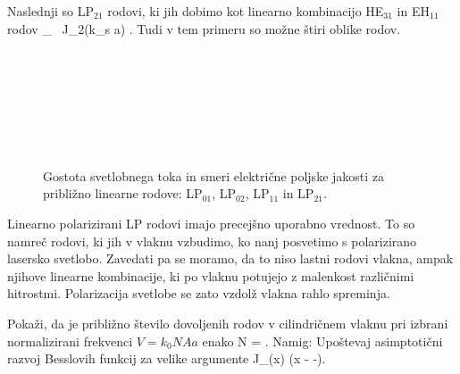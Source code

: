 Naslednji so LP$_{21}$ rodovi, ki jih dobimo kot linearno kombinacijo HE$_{31}$
in EH$_{11}$ rodov
\beq
{}_  \, J_2(k_s a)
{ \varphi \brace {}\varphi}.
\eeq
Tudi v tem primeru so možne štiri oblike rodov. 

\begin{figure}[h!]
\centering
\def\svgwidth{93truemm} 
 \\
\def\svgwidth{93truemm} 
 \\
\def\svgwidth{93truemm} 
 \\
\def\svgwidth{93truemm} 
 \\
\def\svgwidth{93truemm} 
 \\
\def\svgwidth{93truemm} 
 \\
\caption{Gostota svetlobnega toka in smeri električne poljske jakosti za približno linearne rodove:
LP$_{01}$, LP$_{02}$, LP$_{11}$ in LP$_{21}$.}
\label{fig:LP}
\end{figure}

Linearno polarizirani LP rodovi imajo precejšno uporabno vrednost. To so 
namreč rodovi, ki jih v vlaknu vzbudimo, ko nanj posvetimo s polarizirano 
lasersko svetlobo. Zavedati pa se moramo, da to niso lastni rodovi vlakna, 
ampak njihove linearne kombinacije, ki po vlaknu potujejo z malenkost različnimi
hitrostmi. Polarizacija svetlobe se zato vzdolž vlakna rahlo spreminja.

\begin{definition}
Pokaži, da je približno število dovoljenih rodov v cilindričnem vlaknu pri 
izbrani normalizirani frekvenci $V = k_0 NA a$ enako
\beq 
N = .
\eeq
Namig: Upoštevaj asimptotični razvoj Besslovih funkcij za velike argumente
\beq
J_\nu (x) \approx {}\cos \left(x -  
-\right).
\eeq
\end{definition}
\newpage
